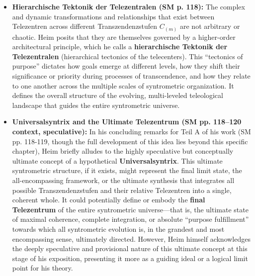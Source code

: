 \documentclass[12pt]{article}
\newcommand{\q}[1]{\enquote{#1}}
\begin{document}
\begin{itemize}
    \item \textbf{Hierarchische Tektonik der Telezentralen (SM p. 118):}
    The complex and dynamic transformations and relationships that exist between Telezentren across different Transzendenzstufen \( C_{(m)} \) are not arbitrary or chaotic. Heim posits that they are themselves governed by a higher-order architectural principle, which he calls a \textbf{hierarchische Tektonik der Telezentralen} (hierarchical tectonics of the telecenters). This \q{tectonics of purpose} dictates how goals emerge at different levels, how they shift their significance or priority during processes of transcendence, and how they relate to one another across the multiple scales of syntrometric organization. It defines the overall structure of the evolving, multi-leveled teleological landscape that guides the entire syntrometric universe.

    \item \textbf{Universalsyntrix and the Ultimate Telezentrum (SM pp. 118–120 context, speculative):}
    In his concluding remarks for Teil A of his work (SM pp. 118-119, though the full development of this idea lies beyond this specific chapter), Heim briefly alludes to the highly speculative but conceptually ultimate concept of a hypothetical \textbf{Universalsyntrix}. This ultimate syntrometric structure, if it exists, might represent the final limit state, the all-encompassing framework, or the ultimate synthesis that integrates all possible Transzendenzstufen and their relative Telezentren into a single, coherent whole. It could potentially define or embody the \textbf{final Telezentrum} of the entire syntrometric universe—that is, the ultimate state of maximal coherence, complete integration, or absolute \q{purpose fulfillment} towards which all syntrometric evolution is, in the grandest and most encompassing sense, ultimately directed. However, Heim himself acknowledges the deeply speculative and provisional nature of this ultimate concept at this stage of his exposition, presenting it more as a guiding ideal or a logical limit point for his theory.


\end{itemize}
\end{document}

